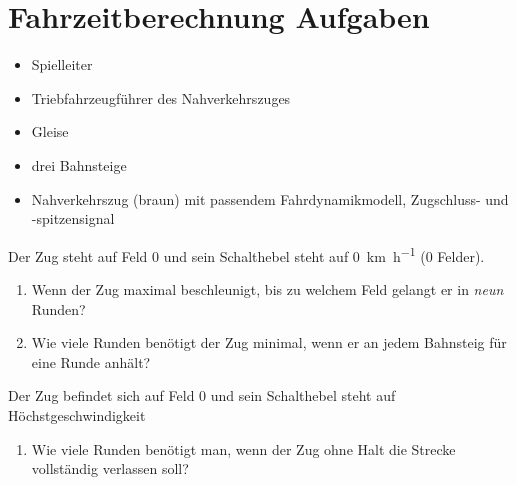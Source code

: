 

\section{Fahrzeitberechnung Aufgaben}

  \roles
    \begin{itemize}
      \item Spielleiter
      \item Triebfahrzeugführer des Nahverkehrszuges
    \end{itemize}

  \material
    \begin{itemize}
      \item Gleise
      \item drei Bahnsteige
      \item Nahverkehrszug (braun) mit passendem Fahrdynamikmodell, Zugschluss- und -spitzensignal
    \end{itemize}

  \setup

  \task
    Der Zug steht auf Feld 0 und sein Schalthebel steht auf \SI{0}{\kilo\metre\per\hour} (0 Felder).
    \begin{enumerate}[label=\alph*)]
      \item Wenn der Zug maximal beschleunigt, bis zu welchem Feld gelangt er in \emph{neun} Runden?
      \item Wie viele Runden benötigt der Zug minimal, wenn er an jedem Bahnsteig für eine Runde anhält?
    \end{enumerate}

  \setup
    Der Zug befindet sich auf Feld 0 und sein Schalthebel steht auf Höchstgeschwindigkeit
    \begin{enumerate}[label=\alph*),resume]
      \item Wie viele Runden benötigt man, wenn der Zug ohne Halt die Strecke vollständig verlassen soll?
    \end{enumerate}

